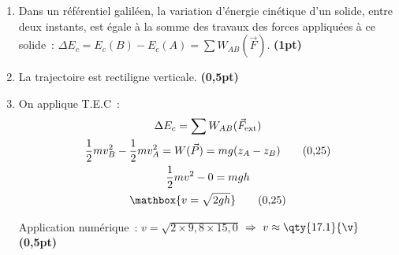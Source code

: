 \begin{enumerate}
    \item Dans un référentiel galiléen, la variation d'énergie cinétique d'un
          solide, entre deux instants, est égale à la somme des travaux des
          forces appliquées à ce solide~:
          $\Delta E_c=E_c(B)-E_c(A)=\sum W_{AB}(\vec{F})$. \hfill\textbf{(1pt)}
    \item La trajectoire est rectiligne verticale. \hfill\textbf{(0,5pt)}
    \item On applique T.E.C~:
    \begin{gather*}
        \Delta E_c=\sum W_{AB}(\vec{F}_{\text{ext}}) \\
        \frac{1}{2}m v_B^2-\frac{1}{2}m v_A^2=W(\vec{P})=mg(z_{A}-z_{B})
        \tag{0,25} \\
        \frac{1}{2}m v^2-0=mgh \\
        \mathbox{v=\sqrt{2gh}}
        \tag{0,25}
    \end{gather*}

    Application numérique~:
    $v=\sqrt{2\times 9,8\times 15,0}$ \quad
    $\Rightarrow\ v\approx \qty{17.1}{\v}$ \hfill\textbf{(0,5pt)}
\end{enumerate}

